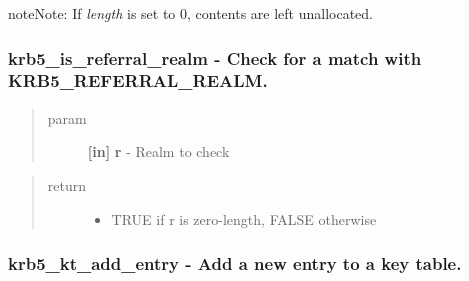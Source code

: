 \documentclass[letterpaper,10pt,english]{sphinxmanual}
\begin{document}
\begin{notice}{note}{Note:}
If \emph{length} is set to 0, contents are left unallocated.
\end{notice}


\subsubsection{krb5\_is\_referral\_realm -  Check for a match with KRB5\_REFERRAL\_REALM.}
\label{appdev/refs/api/krb5_is_referral_realm:krb5-is-referral-realm-check-for-a-match-with-krb5-referral-realm}\label{appdev/refs/api/krb5_is_referral_realm::doc}

\begin{fulllineitems}
\label{appdev/refs/api/krb5_is_referral_realm:krb5_is_referral_realm}
\end{fulllineitems}

\begin{quote}\begin{description}
\item[{param}] \leavevmode
\textbf{{[}in{]}} \textbf{r} - Realm to check

\end{description}\end{quote}
\begin{quote}\begin{description}
\item[{return}] \leavevmode\begin{itemize}
\item {} 
TRUE if r is zero-length, FALSE otherwise

\end{itemize}

\end{description}\end{quote}


\subsubsection{krb5\_kt\_add\_entry -  Add a new entry to a key table.}
\label{appdev/refs/api/krb5_kt_add_entry:krb5-kt-add-entry-add-a-new-entry-to-a-key-table}\label{appdev/refs/api/krb5_kt_add_entry::doc}
\end{document}

